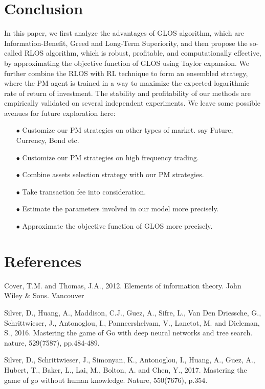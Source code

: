 \documentclass{gapd}
\begin{document}
\section{Conclusion}

In this paper, we first analyze the advantages of GLOS algorithm, which are Information-Benefit, Greed and Long-Term Superiority, and then propose the so-called RLOS algorithm, which is robust, profitable, and computationally effective, by approximating the objective function of GLOS using Taylor expansion. We further combine the RLOS with RL technique to form an ensembled strategy, where the PM agent is trained in a way to maximize the expected logarithmic rate of return of investment. The stability and profitability of our methods are empirically validated on several independent experiments. We leave some possible avenues for future exploration here:
\begin{itemize}
	\item[$\bullet$] Customize our PM strategies on other types of market. say Future, Currency, Bond etc.
	\item[$\bullet$] Customize our PM strategies on high frequency trading.	
	\item[$\bullet$] Combine assets selection strategy with our PM strategies.
	\item[$\bullet$] Take transaction fee into consideration.
	\item[$\bullet$] Estimate the parameters involved in our model more precisely.
	\item[$\bullet$] Approximate the objective function of GLOS more precisely.
\end{itemize}

\section*{References}

\noindent[1] Cover, T.M. and Thomas, J.A., 2012. Elements of information theory. John Wiley \& Sons.
Vancouver

\noindent[2] Silver, D., Huang, A., Maddison, C.J., Guez, A., Sifre, L., Van Den Driessche, G., Schrittwieser, J., Antonoglou, I., Panneershelvam, V., Lanctot, M. and Dieleman, S., 2016. Mastering the game of Go with deep neural networks and tree search. nature, 529(7587), pp.484-489.

\noindent[3] Silver, D., Schrittwieser, J., Simonyan, K., Antonoglou, I., Huang, A., Guez, A., Hubert, T., Baker, L., Lai, M., Bolton, A. and Chen, Y., 2017. Mastering the game of go without human knowledge. Nature, 550(7676), p.354.
\end{document}
